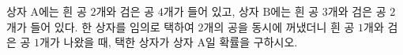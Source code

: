 상자 $\mathrm{A}$에는 흰 공 $2$개와 검은 공 $4$개가 들어 있고, 상자 $\mathrm{B}$에는 흰 공 $3$개와 검은 공 $2$개가 들어 있다. 한 상자를 임의로 택하여 $2$개의 공을 동시에 꺼냈더니 흰 공 $1$개와 검은 공 $1$개가 나왔을 때, 택한 상자가 상자 $\mathrm{A}$일 확률을 구하시오.
